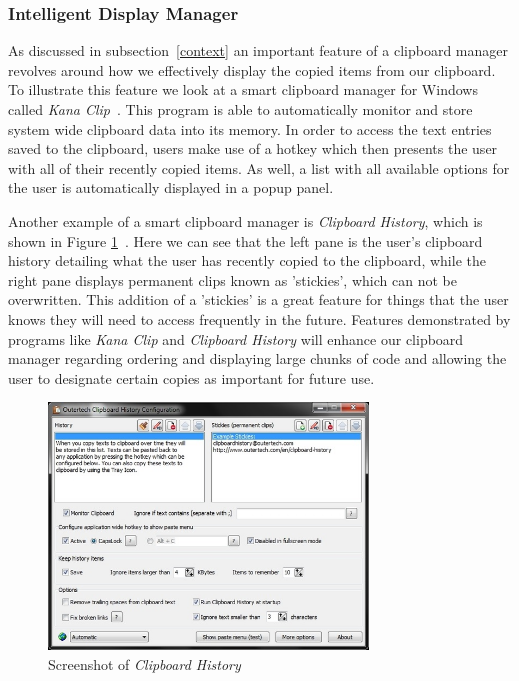 \documentclass{acm_proc_article-sp}
\begin{document}
\subsubsection{Intelligent Display Manager}\label{display}
As discussed in subsection~\ref{context} an important feature of a clipboard manager revolves around how we effectively display the copied items from our clipboard. To illustrate this feature we look at a smart clipboard manager for Windows called \textit{Kana Clip}~\cite{KanaClip}. This program is able to automatically monitor and store system wide clipboard data into its memory. In order to access the text entries saved to the clipboard, users make use of a hotkey which then presents the user with all of their recently copied items. As well, a list with all available options for the user is automatically displayed in a popup panel. 

Another example of a smart clipboard manager is \textit{Clipboard History}, which is shown in Figure \ref{fig:Clip_History}~\cite{ClipHistory}. Here we can see that the left pane is the user's clipboard history detailing what the user has recently copied to the clipboard, while the right pane displays permanent clips known as 'stickies', which can not be overwritten. This addition of a 'stickies' is a great feature for things that the user knows they will need to access frequently in the future. Features demonstrated by programs like \textit{Kana Clip} and \textit{Clipboard History} will enhance our clipboard manager regarding ordering and displaying large chunks of code and allowing the user to designate certain copies as important for future use.

\begin{figure}[h]
\centering
\includegraphics[width=8.5cm]{ClipHistory}
\caption{Screenshot of \textit{Clipboard History}}
\label{fig:Clip_History}
\end{figure} 
\end{document}
